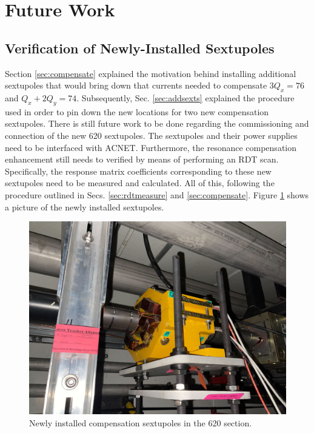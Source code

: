 \section{Future Work}

\subsection{Verification of Newly-Installed Sextupoles}

Section \ref{sec:compensate} explained the motivation behind installing additional sextupoles that would bring down that currents needed to compensate $3Q_x=76$ and $Q_x+ 2Q_y = 74$. Subsequently, Sec. \ref{sec:addsexts} explained the procedure used in order to pin down the new locations for two new compensation sextupoles. There is still future work to be done regarding the commissioning and connection of the new 620 sextupoles. The sextupoles and their power supplies need to be interfaced with ACNET. Furthermore, the resonance compensation enhancement still needs to verified by means of performing an RDT scan. Specifically, the response matrix coefficients corresponding to these new sextupoles need to be measured and calculated. All of this, following the procedure outlined in Secs. \ref{sec:rdtmeasure} and \ref{sec:compensate}. Figure \ref{fig:new620sexts} shows a picture of the newly installed sextupoles.

\begin{figure}[H]
    \centering
    \includegraphics[width=\columnwidth]{chapter7/620_sext.jpg}
    \caption{Newly installed compensation sextupoles in the 620 section.}
    \label{fig:new620sexts}
\end{figure}

